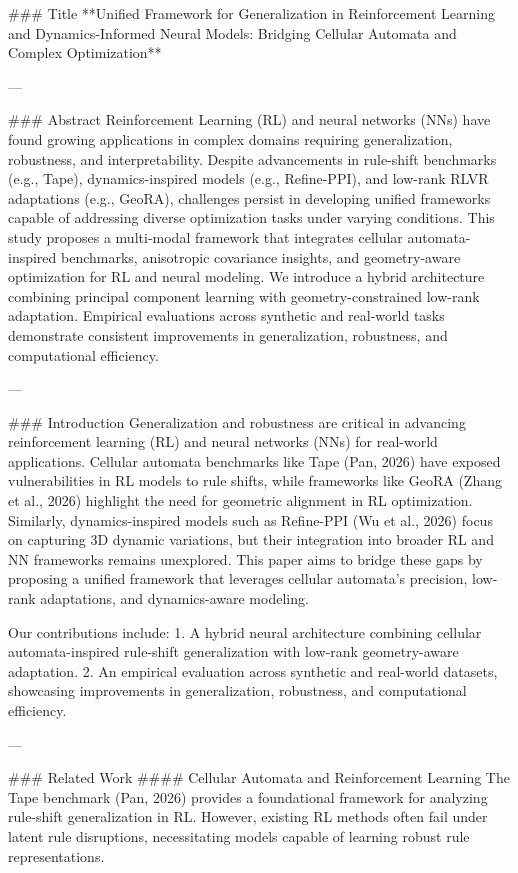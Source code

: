 ### Title  
**Unified Framework for Generalization in Reinforcement Learning and Dynamics-Informed Neural Models: Bridging Cellular Automata and Complex Optimization**

---

### Abstract  
Reinforcement Learning (RL) and neural networks (NNs) have found growing applications in complex domains requiring generalization, robustness, and interpretability. Despite advancements in rule-shift benchmarks (e.g., Tape), dynamics-inspired models (e.g., Refine-PPI), and low-rank RLVR adaptations (e.g., GeoRA), challenges persist in developing unified frameworks capable of addressing diverse optimization tasks under varying conditions. This study proposes a multi-modal framework that integrates cellular automata-inspired benchmarks, anisotropic covariance insights, and geometry-aware optimization for RL and neural modeling. We introduce a hybrid architecture combining principal component learning with geometry-constrained low-rank adaptation. Empirical evaluations across synthetic and real-world tasks demonstrate consistent improvements in generalization, robustness, and computational efficiency.  

---

### Introduction  
Generalization and robustness are critical in advancing reinforcement learning (RL) and neural networks (NNs) for real-world applications. Cellular automata benchmarks like Tape (Pan, 2026) have exposed vulnerabilities in RL models to rule shifts, while frameworks like GeoRA (Zhang et al., 2026) highlight the need for geometric alignment in RL optimization. Similarly, dynamics-inspired models such as Refine-PPI (Wu et al., 2026) focus on capturing 3D dynamic variations, but their integration into broader RL and NN frameworks remains unexplored. This paper aims to bridge these gaps by proposing a unified framework that leverages cellular automata's precision, low-rank adaptations, and dynamics-aware modeling.  

Our contributions include:  
1. A hybrid neural architecture combining cellular automata-inspired rule-shift generalization with low-rank geometry-aware adaptation.  
2. An empirical evaluation across synthetic and real-world datasets, showcasing improvements in generalization, robustness, and computational efficiency.  

---

### Related Work  
#### Cellular Automata and Reinforcement Learning  
The Tape benchmark (Pan, 2026) provides a foundational framework for analyzing rule-shift generalization in RL. However, existing RL methods often fail under latent rule disruptions, necessitating models capable of learning robust rule representations.  

